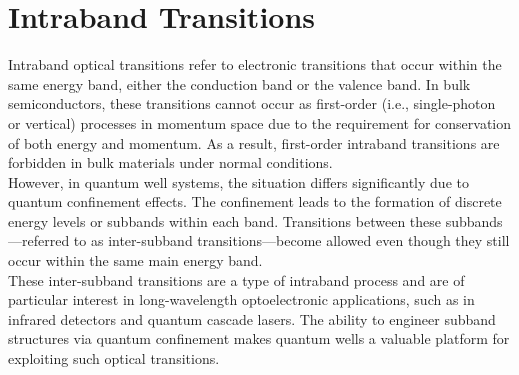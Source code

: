 \section{Intraband Transitions}
Intraband optical transitions refer to electronic transitions that occur within the same energy band, either the conduction band or the valence band. In bulk semiconductors, these transitions cannot occur as first-order (i.e., single-photon or vertical) processes in momentum space due to the requirement for conservation of both energy and momentum. As a result, first-order intraband transitions are forbidden in bulk materials under normal conditions.\\
However, in quantum well systems, the situation differs significantly due to quantum confinement effects. The confinement leads to the formation of discrete energy levels or subbands within each band. Transitions between these subbands—referred to as inter-subband transitions—become allowed even though they still occur within the same main energy band.\\
These inter-subband transitions are a type of intraband process and are of particular interest in long-wavelength optoelectronic applications, such as in infrared detectors and quantum cascade lasers. The ability to engineer subband structures via quantum confinement makes quantum wells a valuable platform for exploiting such optical transitions.

